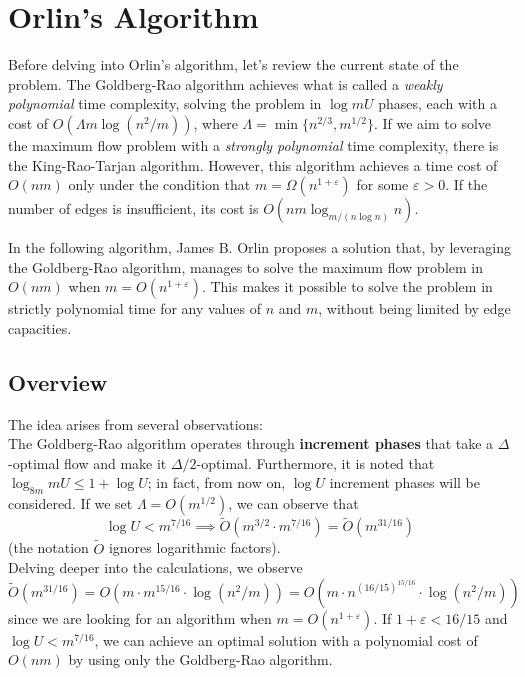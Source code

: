 
\chapter{Orlin's Algorithm} \label{chap:Orlin}

    Before delving into Orlin's algorithm, let's review the current state of the problem.  
    The Goldberg-Rao algorithm achieves what is called a \textit{weakly polynomial} time complexity, solving the problem in \(\log mU\) phases, each with a cost of \( O(\Lambda m \log(n^2/m)) \), where \( \Lambda = \min \{n^{2/3}, m^{1/2}\} \).  
    If we aim to solve the maximum flow problem with a \textit{strongly polynomial} time complexity, there is the King-Rao-Tarjan algorithm. However, this algorithm achieves a time cost of \( O(nm) \) only under the condition that \( m = \Omega (n^{1+\varepsilon}) \) for some \( \varepsilon > 0 \).  
    If the number of edges is insufficient, its cost is \( O(nm \log_{m / (n \log n)} n) \).  

    In the following algorithm, James B. Orlin proposes a solution that, by leveraging the Goldberg-Rao algorithm, manages to solve the maximum flow problem in \( O(nm) \) when \( m = O(n^{1+\varepsilon}) \). This makes it possible to solve the problem in strictly polynomial time for any values of \( n \) and \( m \), without being limited by edge capacities.


\section{Overview}

    The idea arises from several observations:\\
    The Goldberg-Rao algorithm operates through \textbf{increment phases} that take a \(\Delta\)-optimal flow and make it \(\Delta/2\)-optimal.  
    Furthermore, it is noted that \(\log_{8m} mU \leq 1 + \log U\); in fact, from now on, \(\log U\) increment phases will be considered.  
    If we set \(\Lambda = O(m^{1/2})\), we can observe that  
    \[
    \log U < m^{7/16} \implies \tilde{O}(m^{3/2} \cdot m^{7/16}) = \tilde{O}(m^{31/16})
    \]
    (the notation \(\tilde{O}\) ignores logarithmic factors).\\
    Delving deeper into the calculations, we observe  
    \[
    \tilde{O}(m^{31/16}) = O(m \cdot m^{15/16} \cdot \log(n^2/m)) = O(m \cdot n^{(16/15)^{15/16}} \cdot \log(n^2/m))
    \]
    since we are looking for an algorithm when \(m = O(n^{1+\varepsilon})\). If \(1+\varepsilon < 16/15\) and \(\log U < m^{7/16}\), we can achieve an optimal solution with a polynomial cost of \(O(nm)\) by using only the Goldberg-Rao algorithm.

